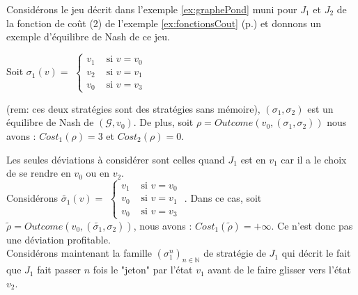 
\begin{exemple}
	Considérons le jeu décrit dans l'exemple \ref{ex:graphePond} muni pour $J_{1}$ et $J_{2}$ de la fonction de coût (2) de l'exemple \ref{ex:fonctionsCout} (p.\pageref{ex:fonctionsCout}) et donnons un exemple d'équilibre de Nash de ce jeu.\\
	
	 \begin{minipage}[c]{0.30\linewidth}Soit $\sigma _{1}(v) =$ $\begin{cases}
						 v_{1} & \text{ si } v = v_{0}\\
						 v_{2} & \text{ si } v = v_{1}\\
						 v_{0} & \text{ si } v = v_{3}
						\end{cases}$ \end{minipage} \hfill
	\begin{minipage}[c]{0.30\linewidth}\end{minipage} \hfill \begin{minipage}[c]{0.30\linewidth}	 \end{minipage} \newline
		
\noindent	(rem: ces deux stratégies sont des stratégies sans mémoire), $(\sigma _{1}, \sigma _{2})$ est un équilibre de Nash de $(\mathcal{G}, v_{0})$. De plus, soit $\rho = Outcome(v_{0},(\sigma _{1},\sigma _{2}))$ nous avons : $Cost_{1}(\rho) = 3$ et $Cost_{2}(\rho) = 0$.\\
\begin{demonstration}	
	Les seules déviations à considérer sont celles quand $J_{1}$ est en $v_{1}$ car il a le choix de se rendre en $v_{0}$ ou en $v_{2}$.\\ Considérons $\tilde{\sigma _{1}}(v) = $ $\begin{cases}
						 v_{1} & \text{ si } v = v_{0}\\
						 v_{0} & \text{ si } v = v_{1}\\
						 v_{0} & \text{ si } v = v_{3}
						\end{cases}$ .
Dans ce cas, soit $\tilde{\rho} = Outcome(v_{0},(\tilde{\sigma _{1}},\sigma _{2}))$, nous avons : \mbox{$Cost_{1}(\tilde{\rho}) = + \infty$}. Ce n'est donc pas une déviation profitable.\\
Considérons maintenant la famille $(\sigma _{1}^{n})_{n \in \mathbb{N}}$ de stratégie de $J_{1}$ qui décrit le fait que $J_{1}$ fait passer $n$ fois le "jeton" par l'état $v_{1}$ avant de le faire glisser vers l'état $v_{2}$. \\


\end{demonstration}
\end{exemple}
